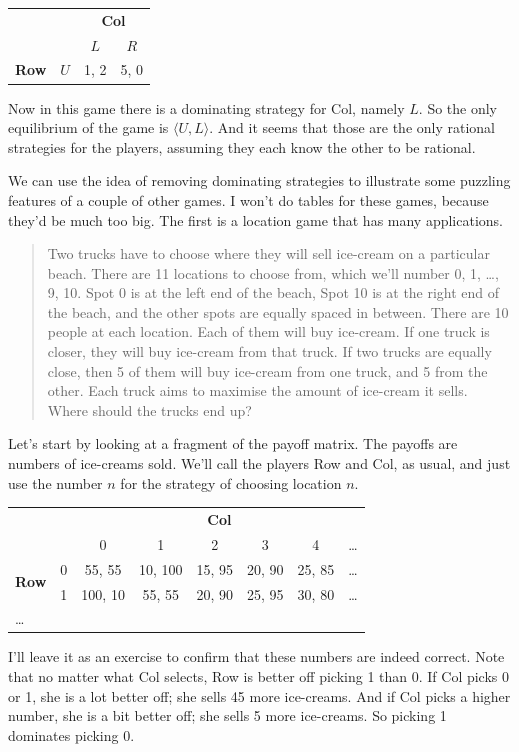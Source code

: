 \documentclass[openany]{book}
\begin{document}
\begin{center}
\begin{tabular}{l r | c c}
& & \multicolumn{2}{c}{\textbf{Col}} \\
& & $L$ & $R$ \\ \hline
\multirow{1}{*}{\textbf{Row}} & $U$ & 1, 2 & 5, 0
\end{tabular}
\end{center}
Now in this game there is a dominating strategy for Col, namely $L$. So the only equilibrium of the game is $\langle U, L \rangle$. And it seems that those are the only rational strategies for the players, assuming they each know the other to be rational. 

We can use the idea of removing dominating strategies to illustrate some puzzling features of a couple of other games. I won't do tables for these games, because they'd be much too big. The first is a location game that has many applications.

\begin{quote}
Two trucks have to choose where they will sell ice-cream on a particular beach. There are 11 locations to choose from, which we'll number 0, 1, \dots, 9, 10. Spot 0 is at the left end of the beach, Spot 10 is at the right end of the beach, and the other spots are equally spaced in between. There are 10 people at each location. Each of them will buy ice-cream. If one truck is closer, they will buy ice-cream from that truck. If two trucks are equally close, then 5 of them will buy ice-cream from one truck, and 5 from the other. Each truck aims to maximise the amount of ice-cream it sells. Where should the trucks end up?
\end{quote}

\noindent Let's start by looking at a fragment of the payoff matrix. The payoffs are numbers of ice-creams sold. We'll call the players Row and Col, as usual, and just use the number $n$ for the strategy of choosing location $n$.

\begin{center}
\begin{tabular}{l r | c c c c c c}
& & \multicolumn{6}{c}{\textbf{Col}} \\
 & & 0 & 1 & 2 & 3 & 4 & \dots  \\ \hline
\multirow{2}{*}{\textbf{Row}}  & 0 & 55, 55 & 10, 100 & 15, 95 & 20, 90 & 25, 85 & \dots \\
& 1 & 100, 10 & 55, 55 & 20, 90 & 25, 95 & 30, 80 & \dots \\
\dots 
\end{tabular}
\end{center}
I'll leave it as an exercise to confirm that these numbers are indeed correct. Note that no matter what Col selects, Row is better off picking 1 than 0. If Col picks 0 or 1, she is a lot better off; she sells 45 more ice-creams. And if Col picks a higher number, she is a bit better off; she sells 5 more ice-creams. So picking 1 dominates picking 0. 
\end{document}
